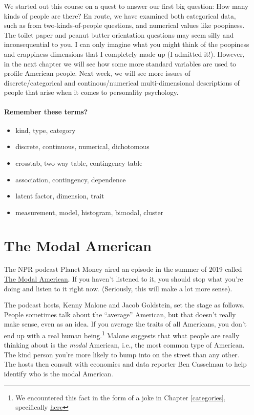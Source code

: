\documentclass[
  openany]{book}
\providecommand{\tightlist}{%
  \setlength{\itemsep}{0pt}\setlength{\parskip}{0pt}}
\begin{document}
We started out this course on a quest to answer our first big question: How many kinds of people are there? En route, we have examined both categorical data, such as from two-kinds-of-people questions, and numerical values like poopiness. The toilet paper and peanut butter orientation questions may seem silly and inconsequential to you. I can only imagine what you might think of the poopiness and crappiness dimensions that I completely made up (I admitted it!). However, in the next chapter we will see how some more standard variables are used to profile American people. Next week, we will see more issues of discrete/categorical and continous/numerical multi-dimensional descriptions of people that arise when it comes to personality psychology.

\hypertarget{remember-these-terms}{%
\subsubsection*{Remember these terms?}\label{remember-these-terms}}

\begin{itemize}
\tightlist
\item
  kind, type, category
\item
  discrete, continuous, numerical, dichotomous
\item
  crosstab, two-way table, contingency table
\item
  association, contingency, dependence
\item
  latent factor, dimension, trait
\item
  measurement, model, histogram, bimodal, cluster
\end{itemize}

\hypertarget{the-modal-american}{%
\chapter{The Modal American}\label{the-modal-american}}

The NPR podcast Planet Money aired an episode in the summer of 2019 called \href{https://www.npr.org/2019/08/28/755191639/episode-936-the-modal-american}{The Modal American}. If you haven't listened to it, you should stop what you're doing and listen to it right now. (Seriously, this will make a lot more sense).

The podcast hosts, Kenny Malone and Jacob Goldstein, set the stage as follows. People sometimes talk about the ``average'' American, but that doesn't really make sense, even as an idea. If you average the traits of all Americans, you don't end up with a real human being.\footnote{We encountered this fact in the form of a joke in Chapter \ref{categories}, specifically \protect\hyperlink{no-mean-feat}{here}} Malone suggests that what people are really thinking about is the \emph{modal} American, i.e., the most common type of American. The kind person you're more likely to bump into on the street than any other. The hosts then consult with economics and data reporter Ben Casselman to help identify who is the modal American.
\end{document}
